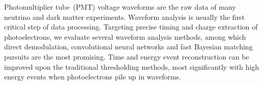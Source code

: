Photomultiplier tube~(PMT) voltage waveforms are the raw data of many neutrino and dark matter experiments.  Waveform analysis is usually the first critical step of data processing.  Targeting precise timing and charge extraction of photoelectrons, we evaluate several waveform analysis methods, among which direct demodulation, convolutional neural networks and fast Bayesian matching pursuits are the most promising. Time and energy event reconstruction can be improved upon the traditional thresholding methods, most significantly with high energy events when photoelectrons pile up in waveforms. 